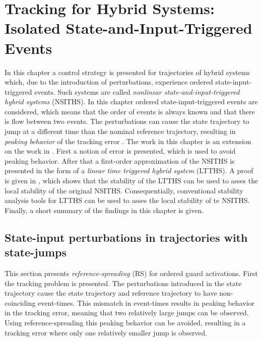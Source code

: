 \documentclass[../DC2017114Bouma.tex]{subfiles}
\begin{document}
\graphicspath{{03_Contribution/img/}}
\renewcommand{\chaptermark}[1]{\markboth{\thechapter.\ #1}{}}
\renewcommand{\sectionmark}[1]{\markright{#1}{}}

\pagestyle{fancyreport}
\cleartooddpage
\pagestyle{fancyreport}
\chapter{Tracking for Hybrid Systems: Isolated State-and-Input-Triggered Events}\label{ch:order}
In this chapter a control strategy is presented for trajectories of hybrid systems which, due to the introduction of perturbations, experience ordered state-input-triggered events. Such systems are called \textit{nonlinear state-and-input-triggered hybrid systems} (NSITHS). In this chapter ordered state-input-triggered events are considered, which means that the order of events is always known and that there is flow between two events. The perturbations can cause the state trajectory to jump at a different time than the nominal reference trajectory, resulting in \textit{peaking behavior} of the tracking error \cite{Menini2001,Biemond2013}. The work in this chapter is an extension on the work in \cite{Rijnen2017}. First a notion of error is presented, which is used to avoid peaking behavior. After that a first-order approximation of the NSITHS is presented in the form of a \textit{linear time triggered hybrid system} (LTTHS). A proof is given in \cite{Rijnen2017}, which shows that the stability of the LTTHS can be used to asses the local stability of the original NSITHS. Consequentially, conventional stability analysis tools for LTTHS can be used to asses the local stability of te NSITHS. Finally, a short summary of the findings in this chapter is given.
%
%

\section{State-input perturbations in trajectories with state-jumps}
This section presents \textit{reference-spreading} (RS) for ordered guard activations. First the tracking problem is presented. The perturbations introduced in the state trajectory cause the state trajectory and reference trajectory to have non-coinciding event-times. This mismatch in event-times results in peaking behavior in the tracking error, meaning that two relatively large jumps can be observed. Using reference-spreading this peaking behavior can be avoided, resulting in a tracking error where only one relatively smaller jump is observed.
%
\end{document}

